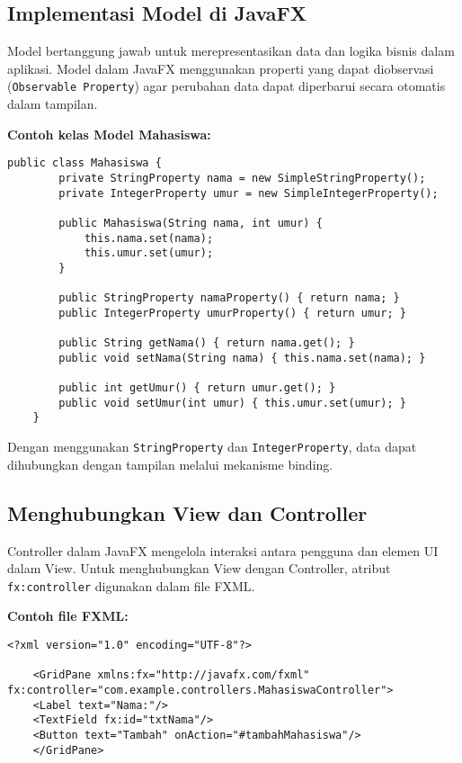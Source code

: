 \subsection{Implementasi Model di JavaFX}

Model bertanggung jawab untuk merepresentasikan data dan logika bisnis dalam aplikasi. Model dalam JavaFX menggunakan properti yang dapat diobservasi (\texttt{Observable Property}) agar perubahan data dapat diperbarui secara otomatis dalam tampilan.

\textbf{Contoh kelas Model Mahasiswa:}
\begin{lstlisting}[style=JavaStyle, caption=Implementasi Model dalam JavaFX]
	public class Mahasiswa {
		private StringProperty nama = new SimpleStringProperty();
		private IntegerProperty umur = new SimpleIntegerProperty();
		
		public Mahasiswa(String nama, int umur) {
			this.nama.set(nama);
			this.umur.set(umur);
		}
		
		public StringProperty namaProperty() { return nama; }
		public IntegerProperty umurProperty() { return umur; }
		
		public String getNama() { return nama.get(); }
		public void setNama(String nama) { this.nama.set(nama); }
		
		public int getUmur() { return umur.get(); }
		public void setUmur(int umur) { this.umur.set(umur); }
	}
\end{lstlisting}

Dengan menggunakan \texttt{StringProperty} dan \texttt{IntegerProperty}, data dapat dihubungkan dengan tampilan melalui mekanisme binding.

\subsection{Menghubungkan View dan Controller}

Controller dalam JavaFX mengelola interaksi antara pengguna dan elemen UI dalam View. Untuk menghubungkan View dengan Controller, atribut \texttt{fx:controller} digunakan dalam file FXML.

\textbf{Contoh file FXML:}
\begin{lstlisting}[style=XmlStyle, caption=File mahasiswa.fxml dengan deklarasi Controller]
	<?xml version="1.0" encoding="UTF-8"?>
	
	<GridPane xmlns:fx="http://javafx.com/fxml" fx:controller="com.example.controllers.MahasiswaController">
	<Label text="Nama:"/>
	<TextField fx:id="txtNama"/>
	<Button text="Tambah" onAction="#tambahMahasiswa"/>
	</GridPane>
\end{lstlisting}

